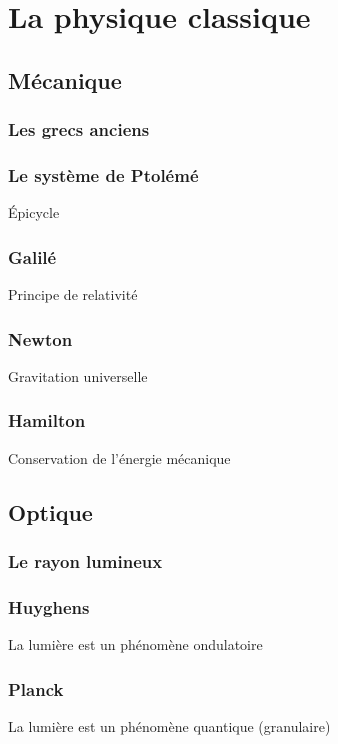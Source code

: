 
\part{La physique classique}

\chapter{Mécanique}
  \section{Les grecs anciens}

  \section{Le système de Ptolémé}
Épicycle
  \section{Galilé}
Principe de relativité
  \section{Newton}
Gravitation universelle
  \section{Hamilton}
Conservation de l'énergie mécanique

\chapter{Optique}
  \section{Le rayon lumineux}
  \section{Huyghens}
La lumière est un phénomène ondulatoire
  \section{Planck}
La lumière est un phénomène quantique (granulaire)

